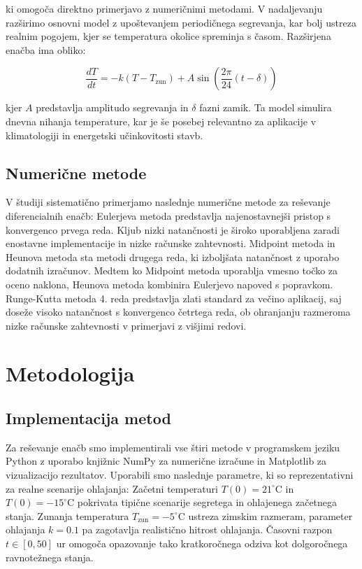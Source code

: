 \documentclass[12pt,a4paper]{article}
\begin{document}
ki omogoča direktno primerjavo z numeričnimi metodami.
V nadaljevanju razširimo osnovni model z upoštevanjem periodičnega segrevanja, 
kar bolj ustreza realnim pogojem, kjer se temperatura okolice spreminja s časom. 
Razširjena enačba ima obliko:

\begin{equation}
\frac{dT}{dt} = -k(T - T_{\mathrm{zun}}) + A\sin\left(\frac{2\pi}{24}(t-\delta)\right)
\end{equation}

kjer $A$ predstavlja amplitudo segrevanja in $\delta$ fazni zamik. 
Ta model simulira dnevna nihanja temperature, kar je še posebej relevantno za aplikacije 
v klimatologiji in energetski učinkovitosti stavb.

\subsection{Numerične metode}

V študiji sistematično primerjamo naslednje numerične metode za reševanje diferencialnih enačb:
Eulerjeva metoda predstavlja najenostavnejši pristop s konvergenco prvega reda. 
Kljub nizki natančnosti je široko uporabljena zaradi enostavne implementacije 
in nizke računske zahtevnosti.
Midpoint metoda in Heunova metoda sta metodi drugega reda, ki izboljšata natančnost 
z uporabo dodatnih izračunov. 
Medtem ko Midpoint metoda uporablja vmesno točko za oceno naklona, 
Heunova metoda kombinira Eulerjevo napoved s popravkom.
Runge-Kutta metoda 4. reda predstavlja zlati standard za večino aplikacij, 
saj doseže visoko natančnost s konvergenco četrtega reda, 
ob ohranjanju razmeroma nizke računske zahtevnosti v primerjavi z višjimi redovi.

\newpage

\section{Metodologija}

\subsection{Implementacija metod}

Za reševanje enačb smo implementirali vse štiri metode v programskem jeziku Python 
z uporabo knjižnic NumPy za numerične izračune in Matplotlib za vizualizacijo rezultatov. 
Uporabili smo naslednje parametre, ki so reprezentativni za realne scenarije ohlajanja:
Začetni temperaturi $T(0) = 21^\circ$C in $T(0) = -15^\circ$C 
pokrivata tipične scenarije segretega in ohlajenega začetnega stanja. 
Zunanja temperatura $T_{\mathrm{zun}} = -5^\circ$C ustreza zimskim razmeram, 
parameter ohlajanja $k = 0.1$ pa zagotavlja realistično hitrost ohlajanja. 
Časovni razpon $t \in [0, 50]$ ur omogoča opazovanje tako kratkoročnega odziva 
kot dolgoročnega ravnotežnega stanja.
\end{document}
